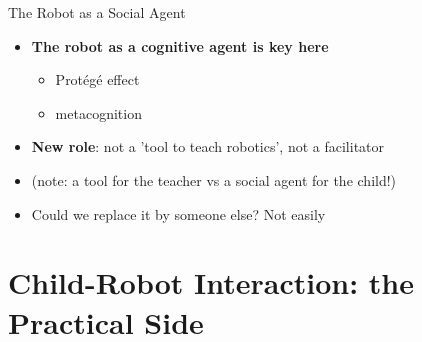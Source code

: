 \documentclass[compress]{beamer}
\begin{document}
{


\begin{frame}{The Robot as a Social Agent}
    \begin{itemize}
        \item<+-> {\bf The robot as a cognitive agent is key here}
            \begin{itemize}
                \item Protégé effect
                \item metacognition
            \end{itemize}
        \item<+-> \textbf{New role}: not a 'tool to teach robotics', not a facilitator
        \item<+-> (note: a tool for the teacher vs a social agent for the child!)
        \item<+-> Could we replace it by someone else? Not easily
    \end{itemize}
\end{frame}
}


\section[Practical CRI]{Child-Robot Interaction: the Practical Side}



\end{document}
